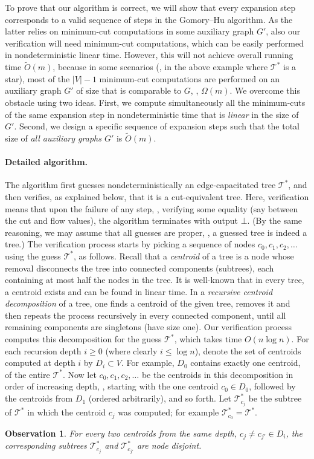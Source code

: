 \documentclass{toc}
\newtheorem{observation}[theorem]{Observation}
\theoremstyle{plain}
\newcommand\tO{\ensuremath{\widetilde O}}  %
\newcommand{\TG}{\mathcal{T}^*}
\providecommand{\card}[1]{\lvert#1\rvert}
\begin{document}
To prove that our algorithm is correct, we will show that every expansion step
corresponds to a valid sequence of steps in the Gomory--Hu algorithm.
As the latter relies on minimum-cut computations in some auxiliary graph $G'$,
also our verification will need minimum-cut computations,
which can be easily performed in nondeterministic linear time.
However, this will not achieve overall running time $\tO(m)$,
because in some scenarios (\eg, in the above example where $\TG$ is a star),
most of the $\card{V}-1$ minimum-cut computations are performed
on an auxiliary graph $G'$ of size that is comparable to $G$, \ie, $\Omega(m)$.
We overcome this obstacle using two ideas.
First, we compute simultaneously all the minimum-cuts of the same expansion step
in nondeterministic time that is \emph{linear} in the size of $G'$.
Second, we design a specific sequence of expansion steps
such that the total size of \emph{all auxiliary graphs $G'$} is $\tO(m)$.

\paragraph{Detailed algorithm.}

The algorithm first guesses nondeterministically an edge-capacitated tree $\TG$,
and then verifies, as explained below, that it is a cut-equivalent tree.
Here, verification means that upon the failure of any step,
\eg, verifying some equality (say between the cut and flow values),
the algorithm terminates with output $\bot$.
(By the same reasoning, we may assume that all guesses are proper,
\eg, a guessed tree is indeed a tree.)
%
The verification process starts by picking
a sequence of nodes $c_0,c_1,c_2,\ldots$ using the guess $\TG$,
as follows.
Recall that a \emph{centroid} of a tree is a node
whose removal disconnects the tree into connected components (subtrees),
each containing at most half the nodes in the tree.
It is well-known that in every tree,
a centroid exists and can be found in linear time.
In a \emph{recursive centroid decomposition} of a tree,
one finds a centroid of the given tree, removes it
and then repeats the process recursively in every connected component,
until all remaining components are singletons (have size one).
Our verification process computes this decomposition for the guess $\TG$,
which takes time $O(n\log n)$.
For each recursion depth $i\ge 0$ (where clearly $i\le \log n$),
denote the set of centroids computed at depth $i$ by $D_i\subset V$.
For example, $D_0$ contains exactly one centroid, of the entire $\TG$.
Now let $c_0,c_1,c_2,\ldots$ be the centroids in this decomposition
in order of increasing depth, \ie, starting with the one centroid $c_0\in D_0$,
followed by the centroids from $D_1$ (ordered arbitrarily), and so forth.
Let $\TG_{c_j}$ be the subtree of $\TG$ in which the centroid $c_j$ was computed; for example $\TG_{c_0}=\TG$.
\begin{observation}\label{observation:disjoint}
For every two centroids from the same depth,
$c_j\neq c_{j'}\in D_i$,
the corresponding subtrees $\TG_{c_j}$ and $\TG_{c_{j'}}$ are node disjoint.
\end{observation}
\end{document}
